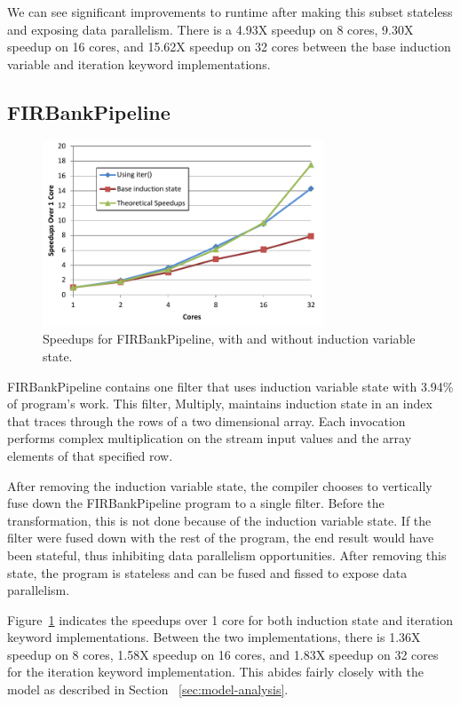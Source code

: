 We can see significant improvements to runtime after making this subset stateless and exposing data parallelism.  There is a 4.93X speedup on 8 cores, 9.30X speedup on 16 cores, and 15.62X speedup on 32 cores between the base induction variable and iteration keyword implementations.  

\subsection{FIRBankPipeline}
\begin{figure}[t]
\includegraphics[width=3.3in]{figures/firbank-results.pdf}
\caption{Speedups for FIRBankPipeline, with and without induction variable state.  \protect\label{fig:firbank-results}}
\end{figure}


FIRBankPipeline contains one filter that uses induction variable state
with 3.94\% of program's work. This filter, Multiply, maintains
induction state in an index that traces through the rows of a two
dimensional array. Each invocation performs complex multiplication on
the stream input values and the array elements of that specified row.

After removing the induction variable state, the compiler chooses to
vertically fuse down the FIRBankPipeline program to a single filter.
Before the transformation, this is not done because of the induction
variable state. If the filter were fused down with the rest of the
program, the end result would have been stateful, thus inhibiting data
parallelism opportunities. After removing this state, the program is
stateless and can be fused and fissed to expose data parallelism.

Figure~\ref{fig:firbank-results} indicates the speedups over 1 core
for both induction state and iteration keyword implementations.
Between the two implementations, there is 1.36X speedup on 8 cores,
1.58X speedup on 16 cores, and 1.83X speedup on 32 cores for the
iteration keyword implementation. This abides fairly closely with the
model as described in Section ~\ref{sec:model-analysis}.
